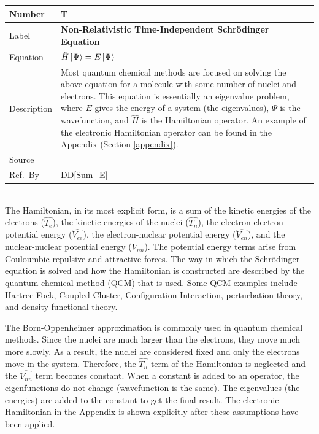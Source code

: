 \documentclass[12pt]{article}
\newcommand{\colAwidth}{0.13\textwidth}
\newcommand{\colBwidth}{0.82\textwidth}
\newcommand{\ddref}[1]{DD\ref{#1}}
\newcounter{theorynum} %
\begin{document}
\noindent
\begin{minipage}{\textwidth}
	\renewcommand*{\arraystretch}{1.5}
	\begin{tabular}{| p{\colAwidth} | p{\colBwidth}|}
		\hline
		\rowcolor[gray]{0.9}
		Number& T{theorynum}\thetheorynum \label{T_SE}\\
		\hline
		Label&\bf Non-Relativistic Time-Independent Schr\"{o}dinger Equation \\
		\hline
		Equation&  $\hat{H}\ket{\Psi} = E\ket{\Psi}$ \\
		\hline
		Description & 
		Most quantum chemical methods are focused on solving the above equation 
		for a molecule with some number of nuclei and electrons. This equation 
		is essentially an eigenvalue problem, where $E$ gives the energy of a 
		system (the eigenvalues), $\Psi$ is the wavefunction, and $\hat{H}$ is 
		the Hamiltonian operator. An example of the electronic Hamiltonian 
		operator can be found in the Appendix (Section \ref{appendix}).\\
		\hline
		Source & \cite{szabo-ostlund} \\
		\hline
		Ref.\ By & \ddref{Sum_E}\\
		\hline
	\end{tabular}
\end{minipage}\\

The Hamiltonian, in its most explicit form, is a sum of the kinetic energies of 
the electrons ($\hat{T_e}$), the kinetic energies of the nuclei ($\hat{T_n}$), 
the electron-electron potential energy ($\hat{V_{ee}}$), the electron-nuclear 
potential energy ($\hat{V_{en}}$), and the nuclear-nuclear potential energy 
($\hat{V_{nn}}$). The potential energy terms arise from Couloumbic repulsive 
and attractive forces. The way in which the Schr\"{o}dinger equation is solved 
and how the Hamiltonian is constructed are described by the quantum chemical 
method (QCM) that is used. Some QCM examples include Hartree-Fock, 
Coupled-Cluster, Configuration-Interaction, perturbation theory, and density 
functional theory.

The Born-Oppenheimer approximation is commonly used in quantum chemical 
methods. Since the nuclei are much larger than the electrons, they move much 
more slowly. As a result, the nuclei are considered fixed and only the 
electrons move in the system. Therefore, the $\hat{T_n}$ term of the 
Hamiltonian is neglected and the $\hat{V_{nn}}$ term becomes constant. When a 
constant is added to an operator, the eigenfunctions do not change 
(wavefunction is the same). The eigenvalues (the energies) are added to the 
constant to get the final result. The electronic Hamiltonian in the 
Appendix is shown explicitly after these assumptions have been applied.
\end{document}
